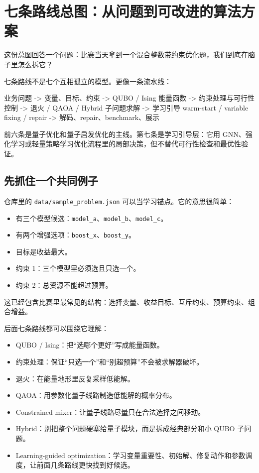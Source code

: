 \documentclass[UTF8,12pt,a4paper]{ctexart}
\begin{document}
\section*{七条路线总图：从问题到可改进的算法方案}

这份总图回答一个问题：比赛当天拿到一个混合整数带约束优化题，我们到底在脑子里怎么拆它？

七条路线不是七个互相孤立的模型。更像一条流水线：

\begin{GuideVerbatim}
业务问题
  -> 变量、目标、约束
  -> QUBO / Ising 能量函数
  -> 约束处理与可行性控制
  -> 退火 / QAOA / Hybrid 子问题求解
  -> 学习引导 warm-start / variable fixing / repair
  -> 解码、repair、benchmark、展示
\end{GuideVerbatim}

前六条是量子优化和量子启发优化的主线。第七条是学习引导层：它用 GNN、强化学习或轻量策略学习优化流程里的局部决策，但不替代可行性检查和最优性验证。

\subsection*{先抓住一个共同例子}

仓库里的 \texttt{data/sample\_problem.json} 可以当学习锚点。它的意思很简单：

\begin{itemize}
\item 有三个模型候选：\texttt{model\_a}、\texttt{model\_b}、\texttt{model\_c}。
\item 有两个增强选项：\texttt{boost\_x}、\texttt{boost\_y}。
\item 目标是收益最大。
\item 约束 1：三个模型里必须选且只选一个。
\item 约束 2：总资源不能超过预算。
\end{itemize}

这已经包含比赛里最常见的结构：选择变量、收益目标、互斥约束、预算约束、组合增益。

后面七条路线都可以围绕它理解：

\begin{itemize}
\item QUBO / Ising：把“选哪个更好”写成能量函数。
\item 约束处理：保证“只选一个”和“别超预算”不会被求解器破坏。
\item 退火：在能量地形里反复采样低能解。
\item QAOA：用参数化量子线路制造低能解的概率分布。
\item Constrained mixer：让量子线路尽量只在合法选择之间移动。
\item Hybrid：别把整个问题硬塞给量子模块，而是拆成经典部分和小 QUBO 子问题。
\item Learning-guided optimization：学习变量重要性、初始解、修复动作和参数调度，让前面几条路线更快找到好候选。
\end{itemize}
\end{document}
